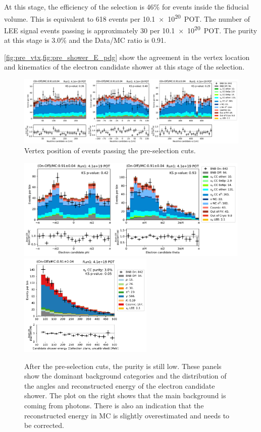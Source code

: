 At this stage, the efficiency of the selection is 46\% for \nuecc events inside the fiducial volume. This is equivalent to 618 events per \SI{10.1e20}{POT}. The number of LEE signal events passing is approximately 30 per \SI{10.1e20}{POT}. The purity at this stage is 3.0\% and the Data/MC ratio is 0.91.

\cref{fig:pre_vtx,fig:pre_shower_E_pdg} show the agreement in the vertex location and kinematics of the electron candidate shower at this stage of the selection. 

\begin{figure}[h]
    \centering
    \includegraphics[width=\textwidth]{NueCCsel/Images/run1/pre_vtx.pdf}
    \caption{Vertex position of events passing the pre-selection cuts.}
    \label{fig:pre_vtx}
\end{figure}

\begin{figure}[h]
    \centering
    \includegraphics[height=4.9cm]{NueCCsel/Images/run1/pre_angles.pdf}
    \includegraphics[height=4.9cm]{NueCCsel/Images/run1/pre_shower_E_pdg.pdf}
    \caption{After the pre-selection cuts, the \nuecc purity is still low. These panels show the dominant background categories and the distribution of the angles and reconstructed energy of the electron candidate shower. The plot on the right shows that the main background is coming from photons. There is also an indication that the reconstructed energy in MC is slightly overestimated and needs to be corrected.}
    \label{fig:pre_shower_E_pdg}
\end{figure}

